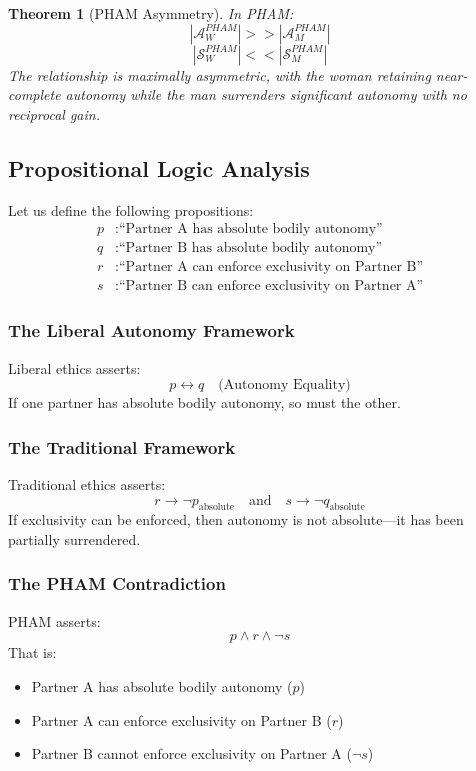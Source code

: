 \documentclass[12pt, letterpaper]{article}
\newtheorem{theorem}{Theorem}[section]
\begin{document}
\begin{theorem}[PHAM Asymmetry]
In PHAM:
\[
|\mathcal{A}_W^{PHAM}| >> |\mathcal{A}_M^{PHAM}|
\]
\[
|\mathcal{S}_W^{PHAM}| << |\mathcal{S}_M^{PHAM}|
\]
The relationship is maximally asymmetric, with the woman retaining near-complete autonomy while the man surrenders significant autonomy with no reciprocal gain.
\end{theorem}

\subsection{Propositional Logic Analysis}

Let us define the following propositions:
\begin{align*}
p &: \text{``Partner A has absolute bodily autonomy''} \\
q &: \text{``Partner B has absolute bodily autonomy''} \\
r &: \text{``Partner A can enforce exclusivity on Partner B''} \\
s &: \text{``Partner B can enforce exclusivity on Partner A''}
\end{align*}

\subsubsection{The Liberal Autonomy Framework}

Liberal ethics asserts:
\[
p \leftrightarrow q \quad \text{(Autonomy Equality)}
\]
If one partner has absolute bodily autonomy, so must the other.

\subsubsection{The Traditional Framework}

Traditional ethics asserts:
\[
r \rightarrow \neg p_{\text{absolute}} \quad \text{and} \quad s \rightarrow \neg q_{\text{absolute}}
\]
If exclusivity can be enforced, then autonomy is not absolute---it has been partially surrendered.

\subsubsection{The PHAM Contradiction}

PHAM asserts:
\[
p \land r \land \neg s
\]
That is:
\begin{itemize}
    \item Partner A has absolute bodily autonomy ($p$)
    \item Partner A can enforce exclusivity on Partner B ($r$)
    \item Partner B cannot enforce exclusivity on Partner A ($\neg s$)
\end{itemize}
\end{document}
